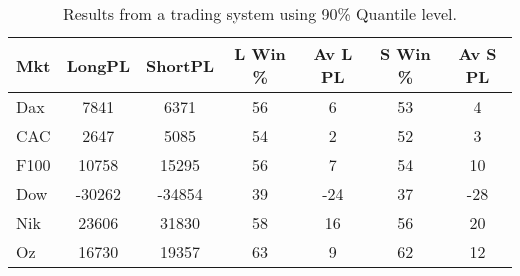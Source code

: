 \begin{table}[ht]
\centering
\caption[Break-out of 90\% Quantile]{Results from a trading system using 90\% Quantile level.} 
\label{tab:q_90_results}
\begin{tabular}{lcccccc}
  \toprule Mkt & LongPL & ShortPL & L Win \% & Av L PL & S Win \% & Av S PL \\ 
  \midrule Dax & 7841 & 6371 & 56 & 6 & 53 & 4 \\ 
  CAC & 2647 & 5085 & 54 & 2 & 52 & 3 \\ 
  F100 & 10758 & 15295 & 56 & 7 & 54 & 10 \\ 
  Dow & -30262 & -34854 & 39 & -24 & 37 & -28 \\ 
  Nik & 23606 & 31830 & 58 & 16 & 56 & 20 \\ 
  Oz & 16730 & 19357 & 63 & 9 & 62 & 12 \\ 
   \bottomrule \end{tabular}
\end{table}
